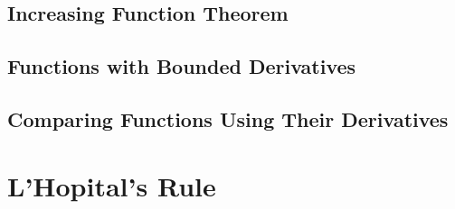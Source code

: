 \subsection{Increasing Function Theorem}
\subsection{Functions with Bounded Derivatives}
\subsection{Comparing Functions Using Their Derivatives}
\section{L'Hopital's Rule}